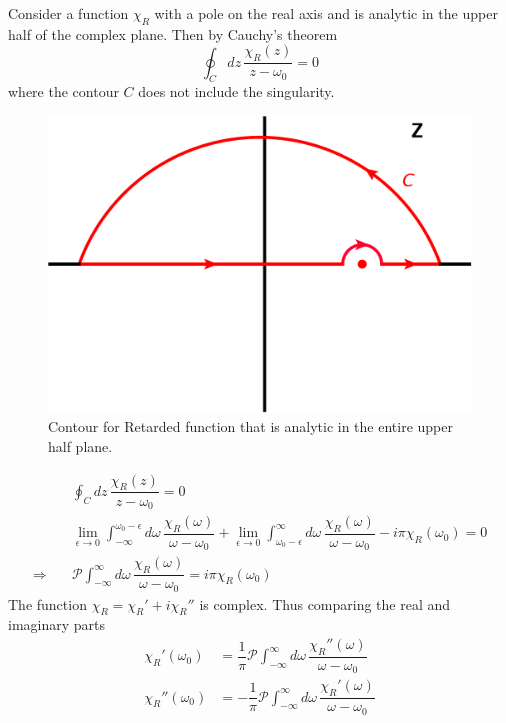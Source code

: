 \documentclass[aps,prb,onecolumn,notitlepage,showpacs,floatfix,superscriptaddress]{revtex4-1}
\begin{document}
Consider a function $\chi_R$ with a pole on the real axis and is analytic in the upper half of the complex plane. Then by Cauchy's theorem
\begin{equation}
\oint_C dz\, \dfrac{\chi_R(z)}{z-\omega_0} =0
\end{equation}
where the contour $C$ does not include the singularity.
\begin{figure}[hbtp]
\centering
\includegraphics[scale=0.07]{retarded.png}
\caption{Contour for Retarded function that is analytic in the entire upper half plane.}
\end{figure}
\begin{equation}
\begin{split}
&\oint_C dz\, \dfrac{\chi_R(z)}{z-\omega_0} =0 \\
&\lim_{\epsilon \rightarrow 0}\int_{-\infty}^{\omega_0-\epsilon} d\omega \, \dfrac{\chi_R(\omega)}{\omega-\omega_0} + \lim_{\epsilon \rightarrow 0} \int_{\omega_0-\epsilon}^\infty d\omega \, \dfrac{\chi_R(\omega)}{\omega-\omega_0} -i \pi \chi_R(\omega_0)=0 \\
\Rightarrow \quad & \mathcal{P}\int_{-\infty}^\infty d\omega \, \dfrac{\chi_R(\omega)}{\omega-\omega_0} = i\pi \chi_R (\omega_0)
\end{split}
\end{equation}
The function $\chi_R = \chi_R' +i \chi_R''$ is complex. Thus comparing the real and imaginary parts
\begin{equation}
\begin{split} 
 \chi_R' (\omega_0) &=\dfrac{1}{\pi} \mathcal{P}\int_{-\infty}^\infty d\omega \, \dfrac{\chi_R''(\omega)}{\omega-\omega_0} \\
  \chi_R'' (\omega_0) &= -\dfrac{1}{\pi}\mathcal{P}\int_{-\infty}^\infty d\omega \, \dfrac{\chi_R'(\omega)}{\omega-\omega_0} 
\end{split}
\end{equation}
\end{document}
